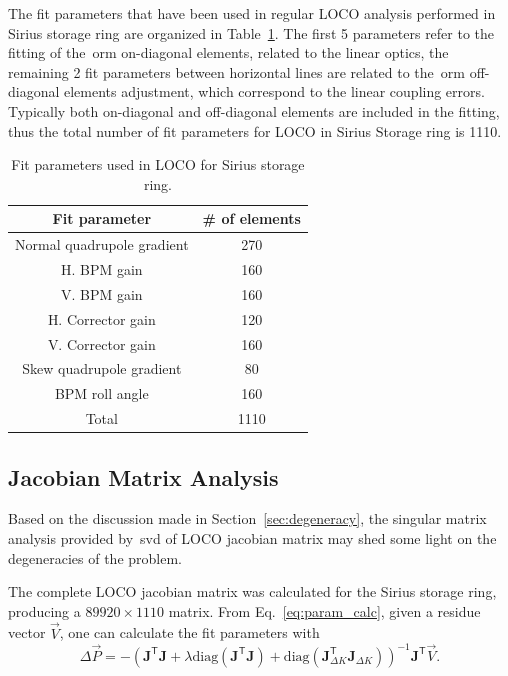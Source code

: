 The fit parameters that have been used in regular LOCO analysis performed in Sirius storage ring are organized in Table~\ref{tab:fit_params}. The first 5 parameters refer to the fitting of the~\gls{orm} on-diagonal elements, related to the linear optics, the remaining 2 fit parameters between horizontal lines are related to the~\gls{orm} off-diagonal elements adjustment, which correspond to the linear coupling errors. Typically both on-diagonal and off-diagonal elements are included in the fitting, thus the total number of fit parameters for LOCO in Sirius Storage ring is 1110.
\begin{table}
    \centering
    \caption{Fit parameters used in LOCO for Sirius storage ring.}
    \label{tab:fit_params}
    \begin{tabular}{cc}
        \toprule\toprule
        Fit parameter & \# of elements \\
        \hline
        Normal quadrupole gradient & 270 \\
        H. BPM gain & 160 \\
        V. BPM gain & 160 \\
        H. Corrector gain & 120 \\
        V. Corrector gain & 160 \\
        \hline
        Skew quadrupole gradient & 80 \\
        BPM roll angle & 160 \\ 
        \hline
        Total & 1110 \\
        \bottomrule\bottomrule
    \end{tabular}
\end{table}

\subsection{Jacobian Matrix Analysis}\label{subsec:jacobian_analysis}
Based on the discussion made in Section~\ref{sec:degeneracy}, the singular matrix analysis provided by~\gls{svd} of LOCO jacobian matrix may shed some light on the degeneracies of the problem.

The complete LOCO jacobian matrix was calculated for the Sirius storage ring, producing a $89920 \times 1110$ matrix. From Eq.~\eqref{eq:param_calc}, given a residue vector $\vec{V}$, one can calculate the fit parameters with
\begin{equation*}
\Delta \vec{P} = - \left(\mathbf{J}^{\mathsf{T}}\mathbf{J} + \lambda \mathrm{diag}\left(\mathbf{J}^{\mathsf{T}}\mathbf{J}\right) + \mathrm{diag}\left(\mathbf{J}^{\mathsf{T}}_{\Delta K}\mathbf{J}_{\Delta K}\right) \right)^{-1}\mathbf{J}^{\mathsf{T}}\vec{V}.
\end{equation*}

